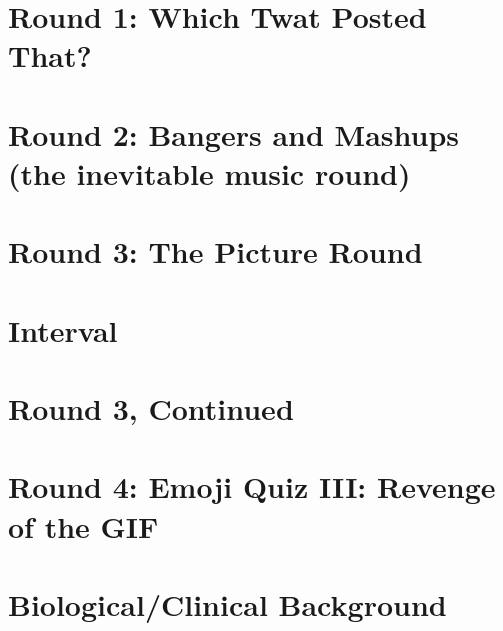 \documentclass{beamer}
\begin{document}
\section{Round 1: Which Twat Posted That?}
\section{Round 2: Bangers and Mashups (the inevitable music round)}
\section{Round 3: The Picture Round}
\section{Interval}
\section{Round 3, Continued}
\section{Round 4: Emoji Quiz III: Revenge of the GIF}



\section{Biological/Clinical Background}
\end{document}
